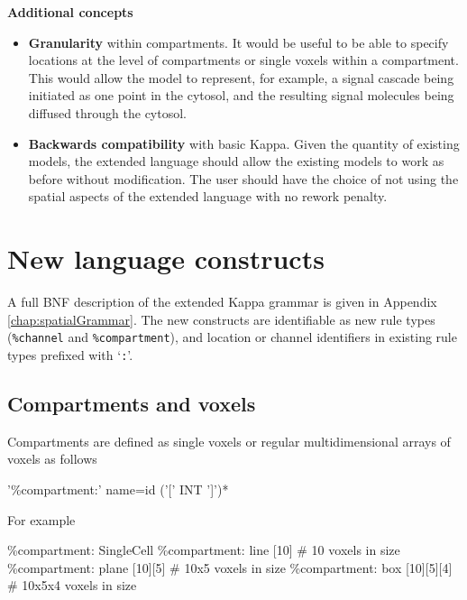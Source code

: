 \textbf{Additional concepts}

\begin{itemize}
 \item \textbf{Granularity} within compartments. It would be useful to be able to specify locations at the level of compartments or single voxels within a compartment. This would allow the model to represent, for example, a signal cascade being initiated as one point in the cytosol, and the resulting signal molecules being diffused through the cytosol. 

 \item \textbf{Backwards compatibility} with basic Kappa. Given the quantity of existing models, the extended language should allow the existing models to work as before without modification. The user should have the choice of not using the spatial aspects of the extended language with no rework penalty.

\end{itemize}


\section{New language constructs}

A full BNF description of the extended Kappa grammar is given in Appendix \ref{chap:spatialGrammar}. The new constructs are identifiable as new rule types (\verb|%channel| and \verb|%compartment|), and location or channel identifiers in existing rule types prefixed with `\verb|:|'.

\subsection{Compartments and voxels}

Compartments are defined as single voxels or regular multidimensional arrays of voxels as follows
\begin{bnfsource}
'\%compartment:' name=id ('[' INT ']')*
\end{bnfsource}
For example
\begin{kappasource}
\%compartment: SingleCell 
\%compartment: line  [10]       # 10 voxels in size
\%compartment: plane [10][5]    # 10x5 voxels in size
\%compartment: box   [10][5][4] # 10x5x4 voxels in size
\end{kappasource}


